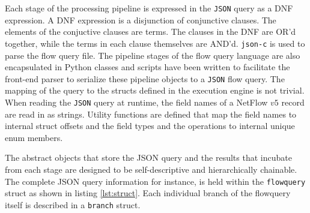 Each stage of the processing pipeline is expressed in the \texttt{JSON} query
as a \ac{DNF} expression. A \ac{DNF} expression is a disjunction of
conjunctive clauses. The elements of the conjuctive clauses are terms. The
clauses in the \ac{DNF} are OR'd together, while the terms in each clause
themselves are AND'd. \texttt{json-c} \cite{jsonc} is used to parse the flow
query file. The pipeline stages of the flow query language are also
encapsulated in Python classes and scripts have been written to facilitate the
front-end parser to serialize these pipeline objects to a \texttt{JSON} flow
query.  The mapping of the query to the structs defined in the execution
engine is not trivial. When reading the \texttt{JSON} query at runtime, the
field names of a NetFlow $v5$ record are read in as strings.  Utility
functions are defined that map the field names to internal struct offsets and
the field types and the operations to internal unique enum members.

The abstract objects that store the JSON query and the results that incubate
from each stage are designed to be self-descriptive and hierarchically
chainable.  The complete JSON query information for instance, is held within
the \texttt{flowquery} struct as shown in listing \ref{lst:struct}. Each
individual branch of the flowquery itself is described in a \texttt{branch}
struct.

